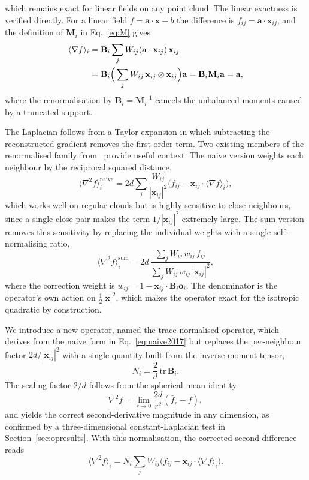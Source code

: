 \documentclass[preprint,review,12pt]{elsarticle}
\newcommand{\xij}{\mathbf{x}_{ij}}
\newcommand{\Mi}{\mathbf{M}_i}
\newcommand{\Bi}{\mathbf{B}_i}
\newcommand{\oi}{\mathbf{o}_i}
\newcommand{\lap}[1]{\langle\nabla^2 #1\rangle}
\newcommand{\gradop}[1]{\langle\nabla #1\rangle}
\begin{document}
which remains exact for linear fields on any point cloud.
The linear exactness is verified directly.
For a linear field $f=\mathbf a\cdot\mathbf x+b$ the difference is $f_{ij}=\mathbf a\cdot\xij$, and the definition of $\Mi$ in Eq.~\eqref{eq:M} gives
\begin{align}
  \gradop{f}_i
  &=\Bi\sum_j W_{ij}(\mathbf a\cdot\xij)\,\xij \notag\\
  &=\Bi\Big(\sum_j W_{ij}\,\xij\otimes\xij\Big)\mathbf a
   =\Bi\Mi\mathbf a=\mathbf a,
  \label{eq:gradexact}
\end{align}
where the renormalisation by $\Bi=\Mi^{-1}$ cancels the unbalanced moments caused by a truncated support.

The Laplacian follows from a Taylor expansion in which subtracting the reconstructed gradient removes the first-order term.
Two existing members of the renormalised family from~\cite{Basic2018} provide useful context.
The naive version weights each neighbour by the reciprocal squared distance,
\begin{equation}
  \lap{f}_i^{\mathrm{naive}}=2d\sum_j \frac{W_{ij}}{|\xij|^2}\big(f_{ij}-\xij\cdot\gradop{f}_i\big),
  \label{eq:naive2017}
\end{equation}
which works well on regular clouds but is highly sensitive to close neighbours, since a single close pair makes the term $1/|\xij|^2$ extremely large.
The sum version removes this sensitivity by replacing the individual weights with a single self-normalising ratio,
\begin{equation}
  \lap{f}_i^{\mathrm{sum}}=2d\,\frac{\sum_j W_{ij}\,w_{ij}\,f_{ij}}{\sum_j W_{ij}\,w_{ij}\,|\xij|^2},
  \label{eq:sum2017}
\end{equation}
where the correction weight is $w_{ij}=1-\xij\cdot\Bi\oi$.
The denominator is the operator's own action on $\tfrac12|\mathbf x|^2$, which makes the operator exact for the isotropic quadratic by construction.

We introduce a new operator, named the trace-normalised operator, which derives from the naive form in Eq.~\eqref{eq:naive2017} but replaces the per-neighbour factor $2d/|\xij|^2$ with a single quantity built from the inverse moment tensor,
\begin{equation}
  N_i=\frac{2}{d}\,\mathrm{tr}\,\Bi.
  \label{eq:N}
\end{equation}
The scaling factor $2/d$ follows from the spherical-mean identity
\begin{equation}
  \nabla^2 f=\lim_{r\to0}\frac{2d}{r^2}(\bar f_r-f),
  \label{eq:spherical_mean}
\end{equation}
and yields the correct second-derivative magnitude in any dimension, as confirmed by a three-dimensional constant-Laplacian test in Section~\ref{sec:opresults}.
With this normalisation, the corrected second difference reads
\begin{equation}
  \lap{f}_i=N_i\sum_j W_{ij}\big(f_{ij}-\xij\cdot\gradop{f}_i\big).
  \label{eq:lapnaive}
\end{equation}
\end{document}
